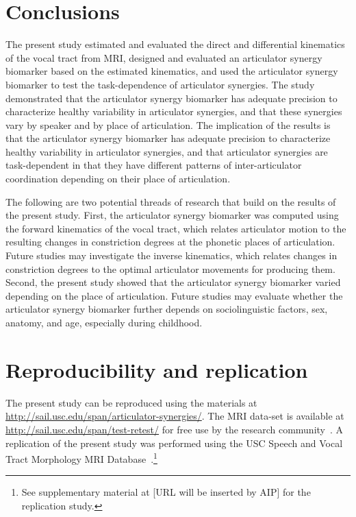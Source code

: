\documentclass[preprint]{JASAnew}
\begin{document}
\section{Conclusions}

The present study estimated and evaluated the direct and differential kinematics of the vocal tract from MRI, 
%
designed and evaluated an articulator synergy biomarker based on the estimated kinematics, and
%
used the articulator synergy biomarker to test the task-dependence of articulator synergies.
%
The study demonstrated that the articulator synergy biomarker has adequate precision to characterize healthy variability in articulator synergies, and that these synergies vary by speaker and by place of articulation. 
%
The implication of the results is that the articulator synergy biomarker has adequate precision to characterize healthy variability in articulator synergies, and that articulator synergies are task-dependent in that they have different patterns of inter-articulator coordination depending on their place of articulation. 



The following are two potential threads of research that build on the results of the present study.
First, the articulator synergy biomarker was computed using the forward kinematics of the vocal tract, which relates articulator motion to the resulting changes in constriction degrees at the phonetic places of articulation. Future studies may investigate the inverse kinematics, which relates changes in constriction degrees to the optimal articulator movements for producing them. 
%
Second, the present study showed that the articulator synergy biomarker varied depending on the place of articulation. Future studies may evaluate whether the articulator synergy biomarker further depends on sociolinguistic factors, sex, anatomy, and age, especially during childhood.

\section{Reproducibility and replication}

The present study can be reproduced using the materials at \url{http://sail.usc.edu/span/articulator-synergies/}.
%
The MRI data-set is available at \url{http://sail.usc.edu/span/test-retest/} for free use by the research community~\citep[see][]{toger2017test}.
%
A replication of the present study was performed using the USC Speech and Vocal Tract Morphology MRI Database~\citep{sorensen2017database}.\footnote{See supplementary material at [URL will be inserted by AIP] for the replication study.}
\end{document}
